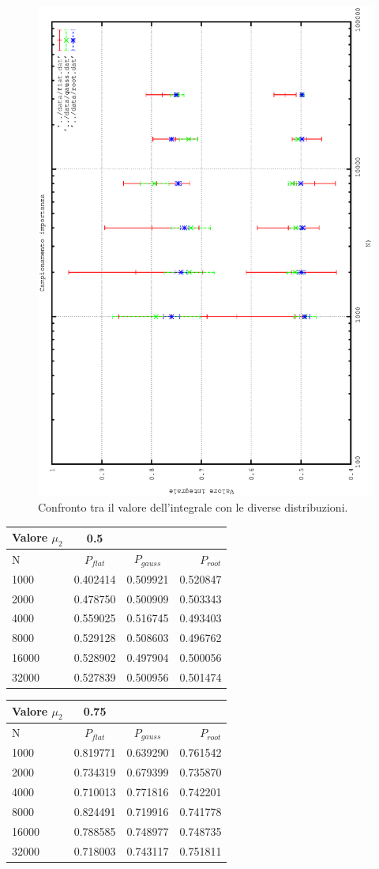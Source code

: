 \begin{figure}[h]
\includegraphics[width=0.6\columnwidth,angle=-90]{importanza_integrale.eps}
\caption{Confronto tra il valore dell'integrale con le diverse distribuzioni.}
\end{figure}
\begin{center}
 \begin{longtable}[htb]{lccr}
  \toprule
  Valore $\mu_2$ & 0.5 & & \\
  \midrule
  N & $P_{flat}$ & $P_{gauss} $  & $P_{root}$ \\
  \midrule
1000   & 0.402414	& 0.509921 	& 0.520847  \\
2000   & 0.478750	& 0.500909 	& 0.503343 \\
4000   & 0.559025	& 0.516745 	& 0.493403 \\
8000   & 0.529128	& 0.508603 	& 0.496762 \\
16000  & 0.528902	& 0.497904 	& 0.500056 \\
32000  & 0.527839	& 0.500956 	& 0.501474 \\
  \bottomrule
  \end{longtable}
\end{center}

\begin{center}
 \begin{longtable}[ht]{lccr}
  \toprule
  Valore $\mu_2$ & 0.75 & & \\
  \midrule
  N & $P_{flat}$ & $P_{gauss} $  & $P_{root}$ \\
  \midrule
1000   & 0.819771 & 	0.639290&0.761542    \\
2000   & 0.734319 & 	0.679399&0.735870   \\
4000   & 0.710013 & 	0.771816&0.742201   \\
8000   & 0.824491 & 	0.719916&0.741778   \\
16000  & 0.788585 & 	0.748977&0.748735   \\
32000  & 0.718003 & 	0.743117&0.751811   \\
  \bottomrule
  \end{longtable}
\end{center}


